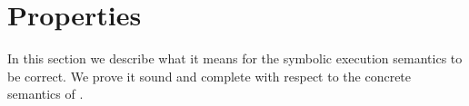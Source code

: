 


\section{Properties}
\label{sec:properties}

In this section we describe what it means for the symbolic execution semantics to be correct.
We prove it sound and complete with respect to the concrete semantics of \TOPHAT.

%
%
%
%
%
%
%
%
%
%
%
